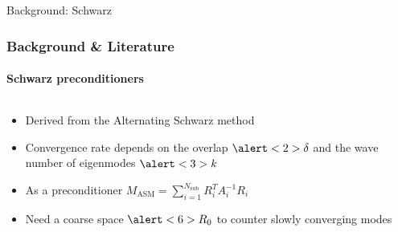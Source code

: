 \footerinfootnotestrue
\begin{frame}[label=background,fragile]{Background: Schwarz}
    \frametitle{Background \& Literature}
    \framesubtitle{Schwarz preconditioners}
    \begin{columns}[T,onlytextwidth]
        \begin{column}{.5\textwidth}
            \begin{itemize}
                \item<1-> Derived from the Alternating Schwarz method\cite{schwarz_methods_Dolean_2015}
                \item<2-> Convergence rate depends on the overlap $\alert<2>{\delta}$ and the wave number of eigenmodes $\alert<3>{k}$
                \item<4-> As a preconditioner $M_{\text{ASM}} = \sum_{i=1}^{N_{\text{sub}}} R_i^T A_i^{-1} R_i$
                \item<5-> Need a coarse space $\alert<6>{R_0}$ to counter slowly converging modes
            \end{itemize}
        \end{column}
        \begin{column}{.49\textwidth}
\end{column}
\end{columns}
\end{frame}
